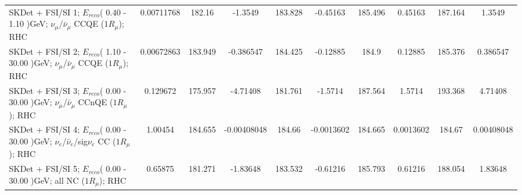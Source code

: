 \documentclass{standalone}
\begin{document}
\begin{tabular}{| l | S | S  S | S  S | S  S | S  S | }
SKDet + FSI/SI  1; $E_{reco}$( 0.40 - 1.10 )GeV; $\nu_{\mu}$/$\bar{\nu}_{\mu}$ CCQE ($1R_{\mu}$); RHC &      0.00711768 &          182.16 &         -1.3549 &         183.828 &        -0.45163 &         185.496 &         0.45163 &         187.164 &          1.3549 \\ 
SKDet + FSI/SI  2; $E_{reco}$( 1.10 - 30.00 )GeV; $\nu_{\mu}$/$\bar{\nu}_{\mu}$ CCQE ($1R_{\mu}$); RHC &      0.00672863 &         183.949 &       -0.386547 &         184.425 &        -0.12885 &           184.9 &         0.12885 &         185.376 &        0.386547 \\ 
SKDet + FSI/SI  3; $E_{reco}$( 0.00 - 30.00 )GeV; $\nu_{\mu}$/$\bar{\nu}_{\mu}$ CCnQE ($1R_{\mu}$); RHC &        0.129672 &         175.957 &        -4.71408 &         181.761 &         -1.5714 &         187.564 &          1.5714 &         193.368 &         4.71408 \\ 
SKDet + FSI/SI  4; $E_{reco}$( 0.00 - 30.00 )GeV; $\nu_{e}$/$\bar{\nu}_{e}$/sig$\nu_{e}$ CC ($1R_{\mu}$); RHC &         1.00454 &         184.655 &     -0.00408048 &          184.66 &      -0.0013602 &         184.665 &       0.0013602 &          184.67 &      0.00408048 \\ 
      SKDet + FSI/SI  5; $E_{reco}$( 0.00 - 30.00 )GeV; all NC ($1R_{\mu}$); RHC &         0.65875 &         181.271 &        -1.83648 &         183.532 &        -0.61216 &         185.793 &         0.61216 &         188.054 &         1.83648 \\ 
\bottomrule
\end{tabular}
\end{document}
